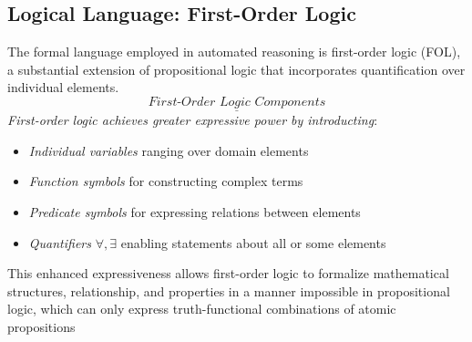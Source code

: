 \documentclass[a4paper]{article}
\theoremstyle{definition}
\begin{document}
\subsection{Logical Language: First-Order Logic}
The formal language employed in automated reasoning is first-order logic (FOL), a substantial extension of propositional logic
that incorporates quantification over individual elements.
\[
  \underline{\textit{First-Order Logic Components}}
\] 
\textit{First-order logic achieves greater expressive power by introducting}:
\begin{itemize}
	\item \textit{Individual variables} ranging over domain elements
	\item \textit{Function symbols} for constructing complex terms 
	\item \textit{Predicate symbols} for expressing relations between elements 
	\item \textit{Quantifiers} \( \forall, \exists \) enabling statements about all or some elements
\end{itemize}
This enhanced expressiveness allows first-order logic to formalize mathematical structures, relationship, and properties 
in a manner impossible in propositional logic, which can only express truth-functional combinations of atomic propositions 
\end{document}
